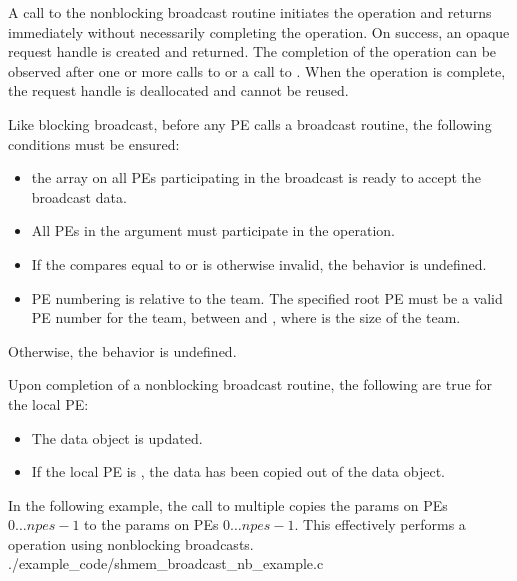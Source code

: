 \begin{apidefinition}
{    A call to the nonblocking broadcast routine initiates the operation and returns
    immediately without necessarily completing the operation. On success,
    an opaque request handle is created and returned. The completion of the
    operation can be observed after one or more calls to  or a
    call to . When the operation is complete, the request handle
    is deallocated and cannot be reused.

    Like blocking broadcast, before any \ac{PE} calls a broadcast routine, the following
    conditions must be ensured:
    \begin{itemize}
    \item the \dest{} array on all \acp{PE} participating in the broadcast
      is ready to accept the broadcast data.
    \item All \acp{PE} in the  argument must participate in
      the operation.
    \item If the  compares equal to  or is
      otherwise invalid, the behavior is undefined.
    \item \ac{PE} numbering is relative to the team. The specified
      root \ac{PE} must be a valid \ac{PE} number for the team,
      between  and , where  is the size of
      the team.
    \end{itemize}
    Otherwise, the behavior is undefined.

    Upon completion of a nonblocking broadcast routine, the following are true for the local
    \ac{PE}:
    \begin{itemize}
    \item The \dest{} data object is updated.
    \item If the local \ac{PE} is , the data has been copied
          out of the \source{} data object.
    \end{itemize}
}




\begin{apiexamples}

\apicexample
    {In the following \Cstd[11] example, the call to multiple  copies the \source{}
    params on \acp{PE} $0\dots npes-1$ to the \dest{} params on \acp{PE} $0\dots npes-1$. This effectively performs a  operation using nonblocking broadcasts.}
    {./example_code/shmem_broadcast_nb_example.c}
    {}

\end{apiexamples}

\end{apidefinition}
